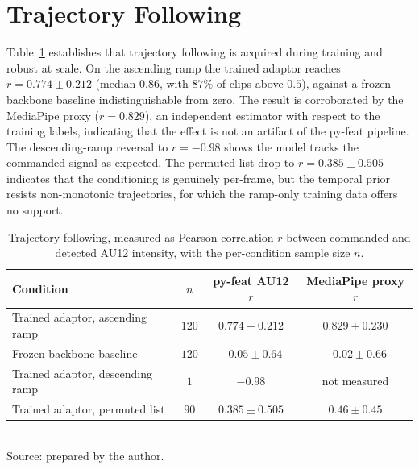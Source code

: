 \section{Trajectory Following}\label{sec:res-ramp}


Table~\ref{tab:res-ramp} establishes that trajectory following is acquired during training and robust at scale.
On the ascending ramp the trained adaptor reaches $r=0.774\pm0.212$ (median $0.86$, with
$87\%$ of clips above $0.5$), against a frozen-backbone baseline indistinguishable from zero.
The result is corroborated by the MediaPipe proxy ($r=0.829$), an independent estimator with respect to the training labels, indicating that the effect is not an artifact of the py-feat pipeline. The descending-ramp reversal to $r=-0.98$ shows the model tracks the commanded signal as expected. The permuted-list drop to $r=0.385\pm0.505$ indicates that the conditioning is genuinely per-frame, but the temporal prior resists non-monotonic trajectories, for which the ramp-only training data offers no support.


\begin{table}[H]
    \centering
    \caption{Trajectory following, measured as Pearson correlation $r$ between commanded and detected AU12 intensity, with the per-condition sample size $n$.}
    \label{tab:res-ramp}
    \begin{tabular}{@{}lccc@{}}
        \toprule
        Condition & $n$ & py-feat AU12 $r$ & MediaPipe proxy $r$ \\
        \midrule
        Trained adaptor, ascending ramp  & $120$ & $0.774 \pm 0.212$ & $0.829 \pm 0.230$ \\
        Frozen backbone baseline         & $120$ & $-0.05 \pm 0.64$  & $-0.02 \pm 0.66$ \\
        Trained adaptor, descending ramp & $1$   & $-0.98$           & not measured \\
        Trained adaptor, permuted list   & $90$  & $0.385 \pm 0.505$ & $0.46 \pm 0.45$ \\
        \bottomrule
    \end{tabular}\\[4pt]
    {\footnotesize Source: prepared by the author.}
\end{table}


